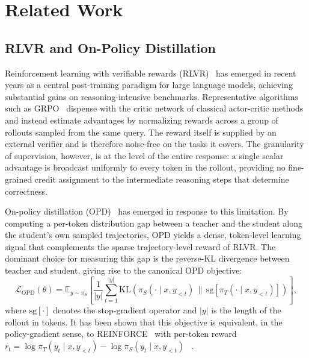 \section{Related Work}
\label{sec:related}

\subsection{RLVR and On-Policy Distillation} 
Reinforcement learning with verifiable rewards (RLVR)~\citep{shao2024deepseekmath,yu2026dapo,liu2025understanding,zheng2025group,pan2025d} has emerged in recent years as a central post-training paradigm for large language models, achieving substantial gains on reasoning-intensive benchmarks. Representative algorithms such as GRPO~\citep{shao2024deepseekmath} dispense with the critic network of classical actor-critic methods and instead estimate advantages by normalizing rewards across a group of rollouts sampled from the same query. The reward itself is supplied by an external verifier and is therefore noise-free on the tasks it covers. The granularity of supervision, however, is at the level of the entire response: a single scalar advantage is broadcast uniformly to every token in the rollout, providing no fine-grained credit assignment to the intermediate reasoning steps that determine correctness. 

On-policy distillation (OPD)~\citep{gu2024minillm,agarwal2024policy} has emerged in response to this limitation. By computing a per-token distribution gap between a teacher and the student along the student's own sampled trajectories, OPD yields a dense, token-level learning signal that complements the sparse trajectory-level reward of RLVR. The dominant choice for measuring this gap is the reverse-KL divergence between teacher and student, giving rise to the canonical OPD objective:
\begin{equation}
\mathcal{L}_{\text{OPD}}(\theta) = \mathbb{E}_{y \sim \pi_S} \left[ \frac{1}{|y|} \sum_{t=1}^{|y|} \mathrm{KL}\left( \pi_S(\cdot \mid x, y_{<t}) \,\|\, \mathrm{sg}[\pi_T(\cdot \mid x, y_{<t})] \right) \right],
\end{equation}
where $\mathrm{sg}[\cdot]$ denotes the stop-gradient operator and $|y|$ is the length of the rollout in tokens. It has been shown that this objective is equivalent, in the policy-gradient sense, to REINFORCE~\citep{williams1992simple} with per-token reward $r_t=\log \pi_T(y_t\mid x,y_{<t}) - \log \pi_S(y_t\mid x,y_{<t})$ ~\citep{gu2024minillm,thinkingmachines2025opd}. 


